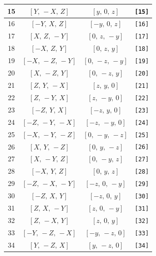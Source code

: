 \documentclass[fleqn,8pt]{jsarticle}
\begin{document}
\begin{longtable}{cccc}
15 & $\left[ Y,\, - X,\, Z \right]$ & $\left[ y,\, 0,\, z \right]$ & {\tt [15]} \\ \hline
16 & $\left[ - Y,\, X,\, Z \right]$ & $\left[ - y,\, 0,\, z \right]$ & {\tt [16]} \\ \hline
17 & $\left[ X,\, Z,\, - Y \right]$ & $\left[ 0,\, z,\, - y \right]$ & {\tt [17]} \\ \hline
18 & $\left[ - X,\, Z,\, Y \right]$ & $\left[ 0,\, z,\, y \right]$ & {\tt [18]} \\ \hline
19 & $\left[ - X,\, - Z,\, - Y \right]$ & $\left[ 0,\, - z,\, - y \right]$ & {\tt [19]} \\ \hline
20 & $\left[ X,\, - Z,\, Y \right]$ & $\left[ 0,\, - z,\, y \right]$ & {\tt [20]} \\ \hline
21 & $\left[ Z,\, Y,\, - X \right]$ & $\left[ z,\, y,\, 0 \right]$ & {\tt [21]} \\ \hline
22 & $\left[ Z,\, - Y,\, X \right]$ & $\left[ z,\, - y,\, 0 \right]$ & {\tt [22]} \\ \hline
23 & $\left[ - Z,\, Y,\, X \right]$ & $\left[ - z,\, y,\, 0 \right]$ & {\tt [23]} \\ \hline
24 & $\left[ - Z,\, - Y,\, - X \right]$ & $\left[ - z,\, - y,\, 0 \right]$ & {\tt [24]} \\ \hline
25 & $\left[ - X,\, - Y,\, - Z \right]$ & $\left[ 0,\, - y,\, - z \right]$ & {\tt [25]} \\ \hline
26 & $\left[ X,\, Y,\, - Z \right]$ & $\left[ 0,\, y,\, - z \right]$ & {\tt [26]} \\ \hline
27 & $\left[ X,\, - Y,\, Z \right]$ & $\left[ 0,\, - y,\, z \right]$ & {\tt [27]} \\ \hline
28 & $\left[ - X,\, Y,\, Z \right]$ & $\left[ 0,\, y,\, z \right]$ & {\tt [28]} \\ \hline
29 & $\left[ - Z,\, - X,\, - Y \right]$ & $\left[ - z,\, 0,\, - y \right]$ & {\tt [29]} \\ \hline
30 & $\left[ - Z,\, X,\, Y \right]$ & $\left[ - z,\, 0,\, y \right]$ & {\tt [30]} \\ \hline
31 & $\left[ Z,\, X,\, - Y \right]$ & $\left[ z,\, 0,\, - y \right]$ & {\tt [31]} \\ \hline
32 & $\left[ Z,\, - X,\, Y \right]$ & $\left[ z,\, 0,\, y \right]$ & {\tt [32]} \\ \hline
33 & $\left[ - Y,\, - Z,\, - X \right]$ & $\left[ - y,\, - z,\, 0 \right]$ & {\tt [33]} \\ \hline
34 & $\left[ Y,\, - Z,\, X \right]$ & $\left[ y,\, - z,\, 0 \right]$ & {\tt [34]} \\ \hline

\end{longtable}
\end{document}

